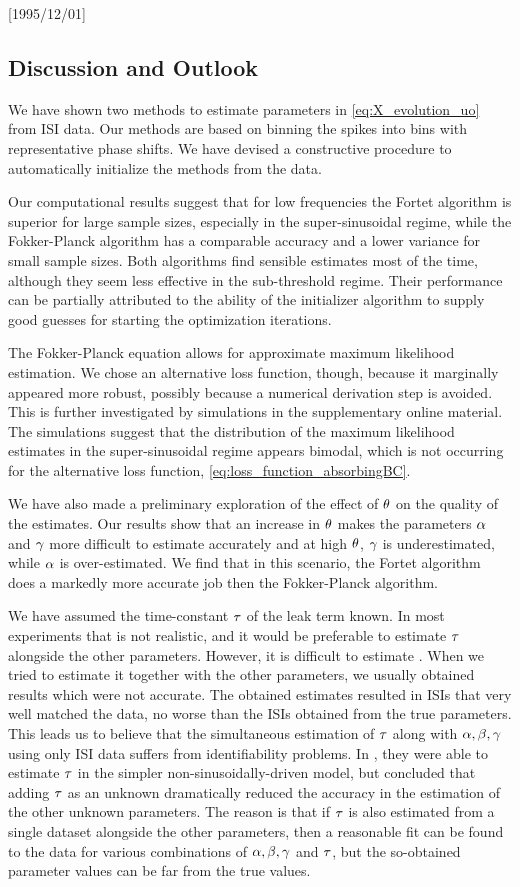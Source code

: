 \NeedsTeXFormat{LaTeX2e}[1995/12/01] \documentclass[10pt]{bmc_article}
\newenvironment{bmcformat}{\begin{raggedright}\baselineskip20pt\sloppy\setboolean{publ}{false}}{\end{raggedright}\baselineskip20pt\sloppy}
\begin{document}
\begin{bmcformat}
\section{Discussion and Outlook}
\label{sec:discusion}
We have shown two methods to estimate parameters in
\cref{eq:X_evolution_uo} from ISI data. Our methods are based
on binning the spikes into bins with representative phase shifts. We have
devised a constructive procedure to automatically initialize the methods from
the data.

Our computational results suggest that for low frequencies the Fortet algorithm
is superior for large sample sizes, especially in the super-sinusoidal regime, while the
Fokker-Planck algorithm has a comparable accuracy and a lower variance for small
sample sizes. Both algorithms find sensible estimates most of the time, although
they seem less effective in the sub-threshold regime. Their performance can
be partially attributed to the ability of the initializer algorithm to supply
good guesses for starting the optimization iterations.

The Fokker-Planck equation allows for approximate maximum likelihood
estimation. We chose an alternative loss function, though, because it
marginally appeared more robust, possibly because a numerical derivation
step is avoided. This is further investigated by simulations in the
supplementary online material. The simulations suggest that the
distribution of the maximum likelihood estimates in the super-sinusoidal
regime appears bimodal, which is not occurring for the alternative loss
function, \cref{eq:loss_function_absorbingBC}. %

We have also made a preliminary exploration of the effect of ${\theta}$ on the
quality of the estimates. Our results show that an increase in ${\theta}$ makes the
parameters ${\alpha}$ and ${\gamma }$ more difficult to estimate accurately and at high
${\theta}$, ${\gamma }$ is underestimated, while ${\alpha}$ is over-estimated. We find that in
this scenario, the Fortet algorithm does a markedly more accurate job then the
Fokker-Planck algorithm.
 
We have assumed  the time-constant ${\tau}$ of the leak term known. In most
experiments that is not realistic, and it would be preferable to estimate ${\tau}$
alongside the other parameters. However, it is difficult to estimate
\cite{DitlevsenLansky212}. When we tried to estimate it together with the other
parameters, we usually obtained results which were not accurate. The obtained
estimates resulted in ISIs that very well matched the data, no worse than the
ISIs obtained from the true parameters. This leads us to believe that the
simultaneous estimation of ${\tau}$ along with ${{\alpha},{\beta},{\gamma } }$ using only ISI data suffers
from identifiability problems. In \cite{Mullowney2008}, they were able to
estimate ${\tau}$ in the simpler non-sinusoidally-driven model, but concluded that
adding ${\tau}$ as an unknown dramatically reduced the accuracy in the estimation of
the other unknown parameters. The reason is that if ${\tau}$ is also estimated from
a single dataset alongside the other parameters, then a reasonable fit can be
found to the data for various combinations of ${{\alpha},{\beta},{\gamma } }$ and ${\tau}$, but the so-obtained
parameter values can be far from the true values.


\end{bmcformat}
\end{document}
